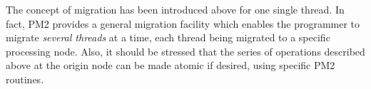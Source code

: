The concept of migration has been introduced above for one single
thread. In fact, PM2 provides a general migration facility which
enables the programmer to migrate \emph{several threads} at a time,
each thread being migrated to a specific processing node. Also, it
should be stressed that the series of operations described above at
the origin node can be made atomic if desired, using specific PM2
routines.
